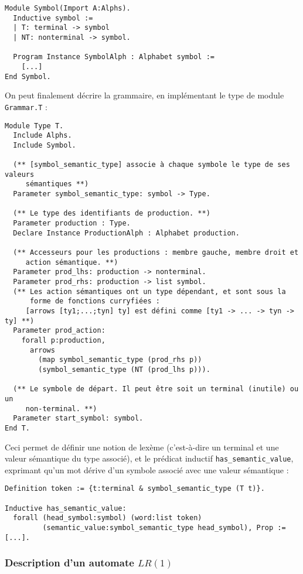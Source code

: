 \documentclass[a4paper,11pt]{article}
\begin{document}
\begin{verbatim}
Module Symbol(Import A:Alphs).
  Inductive symbol :=
  | T: terminal -> symbol
  | NT: nonterminal -> symbol.

  Program Instance SymbolAlph : Alphabet symbol :=
    [...]
End Symbol.
\end{verbatim}

On peut finalement décrire la grammaire, en implémentant le type de
module \verb+Grammar.T+ :

\begin{verbatim}
Module Type T.
  Include Alphs.
  Include Symbol.

  (** [symbol_semantic_type] associe à chaque symbole le type de ses valeurs
     sémantiques **)
  Parameter symbol_semantic_type: symbol -> Type.

  (** Le type des identifiants de production. **)
  Parameter production : Type.
  Declare Instance ProductionAlph : Alphabet production.

  (** Accesseurs pour les productions : membre gauche, membre droit et
     action sémantique. **)
  Parameter prod_lhs: production -> nonterminal.
  Parameter prod_rhs: production -> list symbol.
  (** Les action sémantiques ont un type dépendant, et sont sous la
      forme de fonctions curryfiées :
     [arrows [ty1;...;tyn] ty] est défini comme [ty1 -> ... -> tyn -> ty] **)
  Parameter prod_action:
    forall p:production,
      arrows
        (map symbol_semantic_type (prod_rhs p))
        (symbol_semantic_type (NT (prod_lhs p))).

  (** Le symbole de départ. Il peut être soit un terminal (inutile) ou un
     non-terminal. **)
  Parameter start_symbol: symbol.
End T.
\end{verbatim}

Ceci permet de définir une notion de lexème (c'est-à-dire un terminal
et une valeur sémantique du type associé), et le prédicat inductif
\verb+has_semantic_value+, exprimant qu'un mot dérive d'un symbole
associé avec une valeur sémantique :

\begin{verbatim}
Definition token := {t:terminal & symbol_semantic_type (T t)}.

Inductive has_semantic_value:
  forall (head_symbol:symbol) (word:list token)
         (semantic_value:symbol_semantic_type head_symbol), Prop :=
[...].
\end{verbatim}

\subsubsection{Description d'un automate $LR(1)$}
\end{document}
